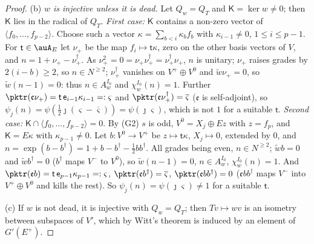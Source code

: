 \documentclass[10pt]{amsart}
\theoremstyle{definition}
\theoremstyle{remark}
\providecommand{\aubar}[1]{\overline{#1}}
\begin{document}
\begin{proof}
(b) \emph{$w$ is injective unless it is dead.} Let $Q_w=Q_T$ and $\mathsf K=\ker w\ne0$; then
$\mathsf K$ lies in the radical of $Q_T$. \emph{First case:} $\mathsf K$ contains a non-zero
vector of $\langle f_0,\dots,f_{p-2}\rangle$. Choose such a vector $\kappa=\sum_{b<i}\kappa_bf_b$
with $\kappa_{i-1}\ne0$, $1\le i\le p-1$. For $\mathsf t\in\auA_E$ let $\nu_+$ be the map
$f_i\mapsto\mathsf t\kappa$, zero on the other basis vectors of $V$, and $n=1+\nu_+-\nu_+^\dagger$.
As $\nu_+^2=0=\nu_+\nu_+^\dagger=\nu_+^\dagger\nu_+$, $n$ is unitary; $\nu_+$ raises grades by
$2(i-b)\ge2$, so $n\in N^{\ge2}$; $\nu_+^\dagger$ vanishes on $V^+\oplus V^0$ and $\tilde w\nu_+=0$,
so $\tilde w(n-1)=0$: thus $n\in A^{I_0}_w$ and $\chi^{I_0}_w(n)=1$. Further
$\pktr(\mathfrak e\nu_+)=\mathsf t\,\mathsf e_{i-1}\kappa_{i-1}=:\varsigma$ and
$\pktr(\mathfrak e\nu_+^\dagger)=\aubar\varsigma$ ($\mathfrak e$ is self-adjoint), so
$\psi_j(n)=\psi(\tfrac12\jmath(\varsigma-\aubar\varsigma))=\psi(\jmath\varsigma)$, which is not $1$
for a suitable $\mathsf t$. \emph{Second case:} $\mathsf K\cap\langle f_0,\dots,f_{p-2}\rangle=0$.
By (G2) $s$ is odd, $V^0=X_j\oplus Ez$ with $z=f_p$, and $\mathsf K=E\kappa$ with
$\kappa_{p-1}\ne0$. Let $b\colon V^0\to V^+$ be $z\mapsto\mathsf t\kappa$, $X_j\mapsto0$, extended
by $0$, and $n=\exp(b-b^\dagger)=1+b-b^\dagger-\tfrac12bb^\dagger$. All grades being even,
$n\in N^{\ge2}$; $\tilde wb=0$ and $\tilde wb^\dagger=0$ ($b^\dagger$ maps $V^-$ to $V^0$), so
$\tilde w(n-1)=0$, $n\in A^{I_0}_w$, $\chi^{I_0}_w(n)=1$. And $\pktr(\mathfrak eb)=\mathsf t\,
\mathsf e_{p-1}\kappa_{p-1}=:\varsigma$, $\pktr(\mathfrak eb^\dagger)=\aubar\varsigma$,
$\pktr(\mathfrak ebb^\dagger)=0$ ($\mathfrak ebb^\dagger$ maps $V^-$ into $V^+\oplus V^0$ and kills
the rest). So $\psi_j(n)=\psi(\jmath\varsigma)\ne1$ for a suitable $\mathsf t$.

(c) If $w$ is not dead, it is injective with $Q_w=Q_T$; then $Tv\mapsto wv$ is an isometry between
subspaces of $V'$, which by Witt's theorem is induced by an element of $G'(E^+)$.
\end{proof}
\end{document}
